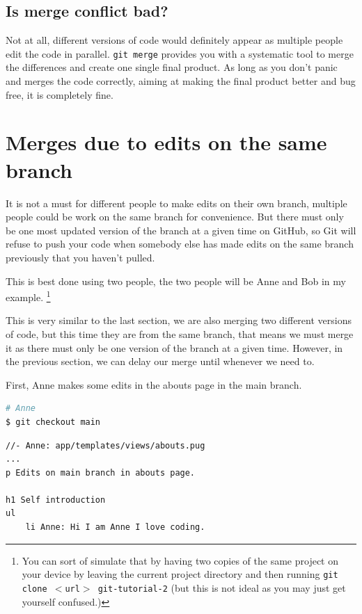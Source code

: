 \subsection*{Is merge conflict bad?}

Not at all, different versions of code would definitely appear as multiple people edit the code in parallel. \texttt{git merge} provides you with a systematic tool to merge the differences and create one single final product. As long as you don't panic and merges the code correctly, aiming at making the final product better and bug free, it is completely fine. 

\section{Merges due to edits on the same branch}
\label{sec:mergesamebranch}

It is not a must for different people to make edits on their own branch, multiple people could be work on the same branch for convenience. But there must only be one most updated version of the branch at a given time on GitHub, so Git will refuse to push your code when somebody else has made edits on the same branch previously that you haven't pulled. 

This is best done using two people, the two people will be Anne and Bob in my example. \footnote{You can sort of simulate that by having two copies of the same project on your device by leaving the current project directory and then running \texttt{git clone $<$url$>$ git-tutorial-2} (but this is not ideal as you may just get yourself confused.)}

This is very similar to the last section, we are also merging two different versions of code, but this time they are from the same branch, that means we must merge it as there must only be one version of the branch at a given time. However, in the previous section, we can delay our merge until whenever we need to.

First, Anne makes some edits in the abouts page in the main branch. 

\begin{lstlisting}[language=bash]
# Anne
$ git checkout main
\end{lstlisting}

\begin{lstlisting}[language=pug]
//- Anne: app/templates/views/abouts.pug
...
p Edits on main branch in abouts page.

h1 Self introduction
ul
	li Anne: Hi I am Anne I love coding.
\end{lstlisting}


